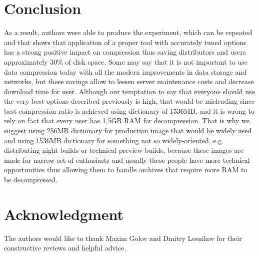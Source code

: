 \documentclass[conference]{IEEEtran}
\begin{document}
\section{Conclusion}
As a result, authors were able to produce the experiment, which can be repeated \cite{link:xz-github} and that shows that application of a proper tool with accurately tuned options has a strong positive impact on compression thus saving distributors and users approximately 30\% of disk space. Some may say that it is not important to use data compression today with all the modern improvements in data storage and networks, but these savings allow to lessen server maintenance costs and decrease download time for user. Although our temptation to say that everyone should use the very best options described previously is high, that would be misleading since best compression ratio is achieved using dictionary of 1536MB, and it is wrong to rely on fact that every user has 1,5GB RAM for decompression. That is why we suggest using 256MB dictionary for production image that would be widely used and using 1536MB dictionary for something not so widely-oriented, e.g. distributing night builds or technical preview builds, because these images are made for narrow set of enthusiasts and usually these people have more technical opportunities thus allowing them to handle archives that require more RAM to be decompressed.
% 
% 

\section*{Acknowledgment}


The authors would like to thank Maxim Golov and Dmitry Lesnikov for their constructive reviews and helpful advice.



\nocite{*}

\printbibliography
\end{document}
